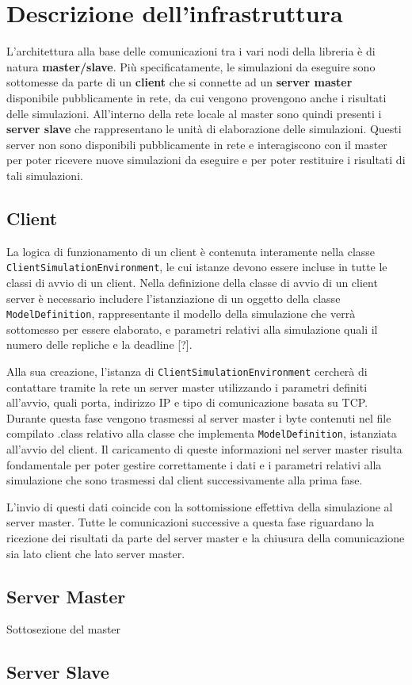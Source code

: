 
\section{Descrizione dell'infrastruttura}
L'architettura alla base delle comunicazioni tra i vari nodi della libreria è di natura \textbf{master/slave}.
Più specificatamente, le simulazioni da eseguire sono sottomesse da parte di un \textbf{client} che si connette ad un \textbf{server master} disponibile pubblicamente in rete, da cui vengono provengono anche i risultati delle simulazioni. 
All'interno della rete locale al master sono quindi presenti i \textbf{server slave} che rappresentano le unità di elaborazione delle simulazioni. Questi server non sono disponibili pubblicamente in rete e interagiscono con il master per poter ricevere nuove simulazioni da eseguire e per poter restituire i risultati di tali simulazioni.

\subsection{Client}
La logica di funzionamento di un client è contenuta interamente nella classe \texttt{ClientSimulationEnvironment}, le cui istanze devono essere incluse in tutte le classi di avvio di un client.
Nella definizione della classe di avvio di un client server è necessario includere l'istanziazione di un oggetto della classe \texttt{ModelDefinition}, rappresentante il modello della simulazione che verrà sottomesso per essere elaborato, e parametri relativi alla simulazione quali il numero delle repliche e la deadline [?].

Alla sua creazione, l'istanza di \texttt{ClientSimulationEnvironment} cercherà di contattare tramite la rete un server master utilizzando i parametri definiti all'avvio, quali porta, indirizzo IP e tipo di comunicazione basata su TCP. 
Durante questa fase vengono trasmessi al server master i byte contenuti nel file compilato .class relativo alla classe che implementa \texttt{ModelDefinition}, istanziata all'avvio del client.
Il caricamento di queste informazioni nel server master risulta fondamentale per poter gestire correttamente i dati e i parametri relativi alla simulazione che sono trasmessi dal client successivamente alla prima fase.

L'invio di questi dati coincide con la sottomissione effettiva della simulazione al server master. 
Tutte le comunicazioni successive a questa fase riguardano la ricezione dei risultati da parte del server master e la chiusura della comunicazione sia lato client che lato server master.

\subsection{Server Master}

Sottosezione del master

\subsection{Server Slave}

